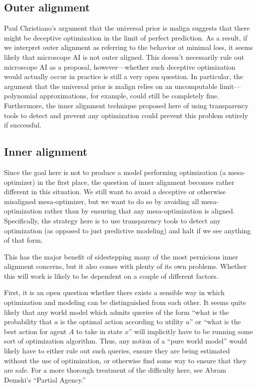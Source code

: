 \documentclass[
  onecolumn,
  natbib,
]{miri-tech-article}
\begin{document}
\subsection{Outer alignment} Paul Christiano's argument that the universal prior is malign suggests that there might be deceptive optimization in the limit of perfect prediction.\cite{universal_prior} As a result, if we interpret outer alignment as referring to the behavior at minimal loss,\cite{outer_alignment} it seems likely that microscope AI is not outer aligned. This doesn't necessarily rule out microscope AI as a proposal, however---whether such deceptive optimization would actually occur in practice is still a very open question. In particular, the argument that the universal prior is malign relies on an uncomputable limit---polynomial approximations, for example, could still be completely fine. Furthermore, the inner alignment technique proposed here of using transparency tools to detect and prevent any optimization could prevent this problem entirely if successful.

\subsection{Inner alignment} Since the goal here is not to produce a model performing optimization (a mesa-optimizer) in the first place, the question of inner alignment becomes rather different in this situation. We still want to avoid a deceptive or otherwise misaligned mesa-optimizer, but we want to do so by avoiding all mesa-optimization rather than by ensuring that any mesa-optimization is aligned. Specifically, the strategy here is to use transparency tools to detect any optimization (as opposed to just predictive modeling) and halt if we see anything of that form.

This has the major benefit of sidestepping many of the most pernicious inner alignment concerns, but it also comes with plenty of its own problems. Whether this will work is likely to be dependent on a couple of different factors.

First, it is an open question whether there exists a sensible way in which optimization and modeling can be distinguished from each other. It seems quite likely that any world model which admits queries of the form ``what is the probability that $a$ is the optimal action according to utility $u$'' or ``what is the best action for agent $A$ to take in state $x$'' will implicitly have to be running some sort of optimization algorithm. Thus, any notion of a ``pure world model'' would likely have to either rule out such queries, ensure they are being estimated without the use of optimization, or otherwise find some way to ensure that they are safe. For a more thorough treatment of the difficulty here, see Abram Demski's ``Partial Agency.''\cite{partial_agency}
\end{document}

